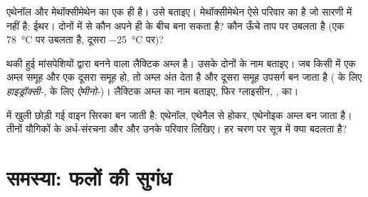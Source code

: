 \begin{exercise}[$\star\star\star$]\label{exo:g11:functional-groups:13}
एथेनॉल  और मेथॉक्सीमेथेन  का 
एक ही है। उसे बताइए। मेथॉक्सीमेथेन ऐसे परिवार का है जो
सारणी में नहीं है: ईथर। दोनों में से कौन अपने ही  के बीच  बना
सकता है? कौन ऊँचे ताप पर उबलता है (एक \qty{78}{\celsius} पर उबलता है,
दूसरा \qty{-25}{\celsius} पर)?
\end{exercise}

\begin{exercise}[$\star\star\star$]\label{exo:g11:functional-groups:14}
थकी हुई मांसपेशियों द्वारा बनने वाला लैक्टिक अम्ल
 है। उसके दोनों  के नाम बताइए। जब
किसी  में एक अम्ल समूह और एक दूसरा समूह हो, तो अम्ल अंत देता है
और दूसरा समूह उपसर्ग बन जाता है ( के लिए \emph{हाइड्रॉक्सी-},
 के लिए \emph{ऐमीनो-})। लैक्टिक अम्ल का नाम बताइए, फिर ग्लाइसीन,
, का।
\end{exercise}

\begin{exercise}[$\star\star\star$]\label{exo:g11:functional-groups:15}
 में खुली छोड़ी गई वाइन सिरका बन जाती है: एथेनॉल, एथेनैल से होकर, एथेनोइक
अम्ल बन जाता है। तीनों यौगिकों के अर्ध-संरचना और 
और उनके परिवार लिखिए। हर चरण पर सूत्र में क्या बदलता है?
\end{exercise}

\section{समस्या: फलों की सुगंध}

